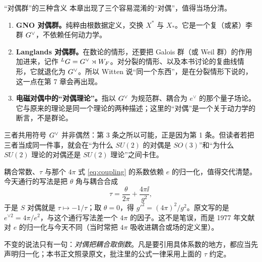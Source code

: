 \begin{pizhu}{“对偶群”的三种含义}
本章出现了三个容易混淆的“对偶”，值得当场分清。

\begin{enumerate}
  \item \textbf{GNO 对偶群。}纯粹由根数据定义，交换 $X^*$ 与 $X_*$。它是一个复（或紧）李群 $G^{\vee}$，不依赖任何动力学。
  \item \textbf{Langlands 对偶群。}在数论的情形，还要把 Galois 群（或 Weil 群）的作用加进来，记作 ${}^LG=G^{\vee}\rtimes W_F$。对分裂的情形、以及本书讨论的复曲线情形，它就退化为 $G^{\vee}$。所以 Witten 说“同一个东西”，是在分裂情形下说的，这一点在第 7 章会再出现。
  \item \textbf{电磁对偶中的“对偶理论”。}指以 $G^{\vee}$ 为规范群、耦合为 $e^\vee$ 的那个量子场论。它与原来的理论是同一个理论的两种描述；这里的“对偶”是一个关于动力学的断言，不是群论。
\end{enumerate}

三者共用符号 $G^{\vee}$ 并非偶然：第 3 条之所以可能，正是因为第 1 条。但读者若把三者当成同一件事，就会在“为什么 $SU(2)$ 的对偶是 $SO(3)$”和“为什么 $SU(2)$ 理论的对偶还是 $SU(2)$ 理论”之间卡住。
\end{pizhu}

\begin{pizhu}{耦合常数、$\tau$ 与那个 $4\pi$}
式 \eqref{eq:coupling} 的系数依赖 $e$ 的归一化，值得交代清楚。今天通行的写法是把 $\theta$ 角与耦合合成
\[
  \tau=\frac{\theta}{2\pi}+\frac{4\pi\ii}{g^2},
\]
于是 $S$ 对偶就是 $\tau\mapsto-1/\tau$；取 $\theta=0$，得 $g'^2=(4\pi)^2/g^2$。原文写的是 $e^{\vee2}=4\pi/e^2$，与这个通行写法差一个 $4\pi$ 的因子。这不是笔误，而是 1977 年文献对 $e$ 的归一化与今天不同（当时常把 $4\pi$ 吸收进耦合或场的定义里）。

不变的说法只有一句：\emph{对偶把耦合取倒数}。凡是要引用具体系数的地方，都应当先声明归一化；本书正文照录原文，批注里的公式一律采用上面的 $\tau$ 约定。
\end{pizhu}
